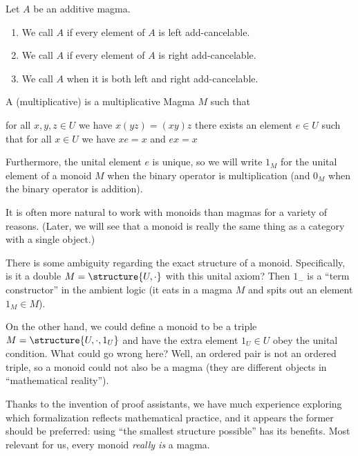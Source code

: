 \begin{definition}\label{defn:add-magma:add-cancelable}
Let $A$ be an additive magma.
\begin{enumerate}
\item{} We call $A$ 
  if every element of $A$ is left add-cancelable.
\item{} We call $A$ 
  if every element of $A$ is right add-cancelable.
\item{} We call $A$ 
  when it is both left and right add-cancelable.
\end{enumerate}
\end{definition}

\begin{definition}[Monoids]\label{defn:monoid}
A (multiplicative)  is a multiplicative Magma $M$ such that
\begin{itemize}
 for all $x,y,z\in U$ we have $x(yz)=(xy)z$
 there exists an element $e\in U$ such that for all
  $x\in U$ we have $xe=x$ and $ex=x$
\end{itemize}
Furthermore, the unital element $e$ is unique, so we will write
$1_{M}$ for the unital element of a monoid $M$ when the binary
operator is multiplication (and $0_{M}$ when the binary operator is
addition). 

It is often more natural to work with monoids than magmas for a
variety of reasons. (Later, we will see that a monoid is really the
same thing as a category with a single object.)
\end{definition}

\begin{remark}
There is some ambiguity regarding the exact structure of a
monoid. Specifically, is it a double $M=\structure{U,\cdot}$ with this
unital axiom? Then $1_{-}$ is a ``term constructor'' in the ambient
logic (it eats in a magma $M$ and spits out an element $1_{M}\in M$).

On the other hand, we could define a monoid to be a triple
$M=\structure{U,\cdot,1_{U}}$ and have the extra element $1_{U}\in U$ obey the
unital condition. What could go wrong here? Well, an ordered pair is
not an ordered triple, so a monoid could not also be a magma (they are
different objects in ``mathematical reality'').

Thanks to the invention of proof assistants, we have much experience
exploring which formalization reflects mathematical practice, and it
appears the former should be preferred: using ``the smallest structure possible''
has its benefits. Most relevant for us, every monoid \emph{really is}
a magma.
\end{remark}

